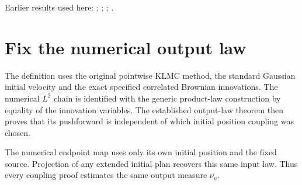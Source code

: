 \documentclass[11pt,a4paper]{article}
\begin{document}
Earlier results used here: \cite[Section~3.17.1]{LangevinLean2026ULASC}; \cite[Section~3.22.6]{LangevinLean2026ULASC}; \cite[Section~3.8.16]{LangevinLean2026ULASC}; \cite[Section~3.8.17]{LangevinLean2026ULASC}.

\section{\texorpdfstring{Fix the numerical output law}{Fix the numerical output law}}


The definition uses the original pointwise KLMC method, the standard Gaussian initial velocity and the exact specified correlated Brownian innovations. The numerical \(L^{2}\) chain is identified with the generic product-law construction by equality of the innovation variables. The established output-law theorem then proves that its pushforward is independent of which initial position coupling was chosen.



The numerical endpoint map uses only its own initial position and the fixed source. Projection of any extended initial plan recovers this same input law. Thus every coupling proof estimates the same output measure \(\nu_n\).
\end{document}
